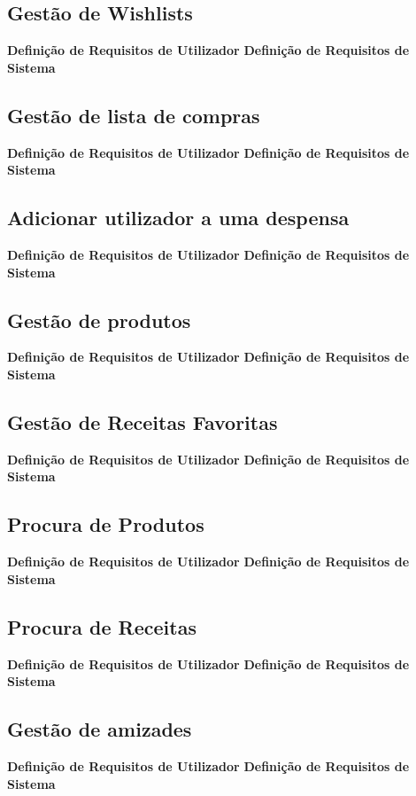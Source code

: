 \documentclass[a4paper]{report}
\begin{document}
        \subsection{Gestão de Wishlists}
            \textbf{Definição de Requisitos de Utilizador}
            \textbf{Definição de Requisitos de Sistema}

        \subsection{Gestão de lista de compras}
            \textbf{Definição de Requisitos de Utilizador}
            \textbf{Definição de Requisitos de Sistema}

        \subsection{Adicionar utilizador a uma despensa}
            \textbf{Definição de Requisitos de Utilizador}
            \textbf{Definição de Requisitos de Sistema}

        \subsection{Gestão de produtos}
            \textbf{Definição de Requisitos de Utilizador}
            \textbf{Definição de Requisitos de Sistema}

        \subsection{Gestão de Receitas Favoritas}
            \textbf{Definição de Requisitos de Utilizador}
            \textbf{Definição de Requisitos de Sistema}

        \subsection{Procura de Produtos}
            \textbf{Definição de Requisitos de Utilizador}
            \textbf{Definição de Requisitos de Sistema}

        \subsection{Procura de Receitas}
            \textbf{Definição de Requisitos de Utilizador}
            \textbf{Definição de Requisitos de Sistema}

        \subsection{Gestão de amizades}
            \textbf{Definição de Requisitos de Utilizador}
            \textbf{Definição de Requisitos de Sistema}
\end{document}
